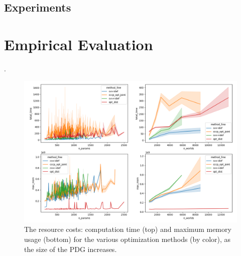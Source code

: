 \subsection{Experiments}




\section{Empirical Evaluation}\label{sec:expt-setup}.



\begin{figure}
    \includegraphics[width=\linewidth]{figs/resources-fine}
    \caption{
        The resource costs: computation time (top) and maximum memory usage (bottom) for the various optimization methods (by color), as the size of the PDG increases.
     }\label{fig:resources}
\end{figure}

